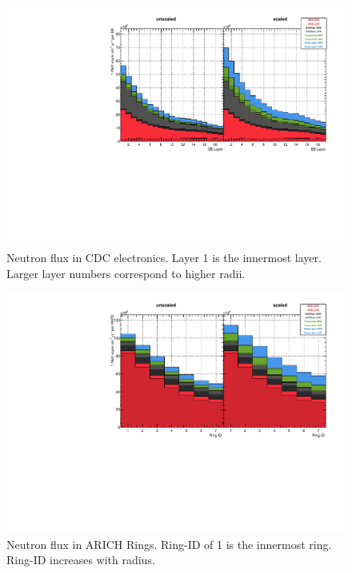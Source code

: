 \begin{figure}[htb]
	\centerfloat
		\includegraphics[width=\textwidth]{images/hCDCFlux}
	\caption[Neutron flux in CDC electronics]{Neutron flux in CDC electronics. Layer 1 is the innermost layer. Larger layer numbers correspond to higher radii.}	
	\label{fig:CDCFlux}
\end{figure}

\begin{figure}[htb]
	\centerfloat
		\includegraphics[width=\textwidth]{images/hARICHFlux}
	\caption[Neutron flux in ARICH rings]{Neutron flux in ARICH Rings. Ring-ID of 1 is the innermost ring. Ring-ID increases with radius.}	
	\label{fig:ARICHFlux}
\end{figure}

